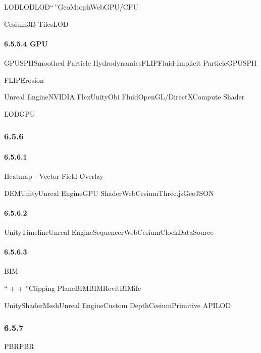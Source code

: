LODLODLOD``\,''GeoMorphWebGPU/CPU

Cesium3D TilesLOD

\hypertarget{gpu}{%
\paragraph{6.5.5.4 GPU}\label{gpu}}

GPUSPHSmoothed Particle HydrodynamicsFLIPFluid-Implicit ParticleGPUSPH

FLIPErosion

Unreal EngineNVIDIA FlexUnityObi FluidOpenGL/DirectXCompute Shader

LODGPU

\hypertarget{section-117}{%
\subsubsection{6.5.6}\label{section-117}}

\hypertarget{section-118}{%
\paragraph{6.5.6.1}\label{section-118}}

Heatmap---Vector Field Overlay

DEMUnityUnreal EngineGPU ShaderWebCesiumThree.jsGeoJSON

\hypertarget{section-119}{%
\paragraph{6.5.6.2}\label{section-119}}

UnityTimelineUnreal EngineSequencerWebCesiumClockDataSource

\hypertarget{section-120}{%
\paragraph{6.5.6.3}\label{section-120}}

BIM

`` + + ''Clipping PlaneBIMBIMRevitBIMifc

UnityShaderMeshUnreal EngineCustom DepthCesiumPrimitive APILOD

\hypertarget{section-121}{%
\subsubsection{6.5.7}\label{section-121}}

PBRPBR

